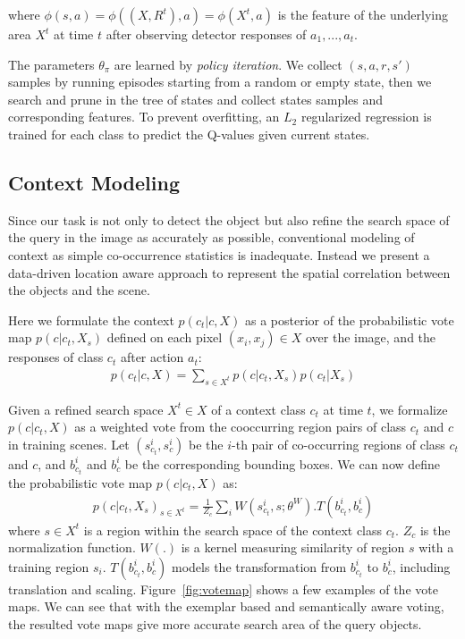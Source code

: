 where $\phi(s,a) = \phi((X, R^t),a) = \phi(X^t,a)$ is the feature of the underlying area $X^t$ at time $t$ after observing detector responses of $a_1,...,a_t$. 

The parameters $\theta_\pi$ are learned by \textit{policy iteration}. We collect $(s,a,r,s')$ samples by running episodes starting from a random or empty state, then we search and prune in the tree of states and collect states samples  and corresponding features. To prevent overfitting, an $L_2$ regularized regression is trained for each class to predict the Q-values given current states.

\subsection{Context Modeling}
\label{sec:context}
Since our task is not only to detect the object but also refine the search space of the query in the image as accurately as possible, conventional modeling of context as simple co-occurrence statistics is inadequate. Instead we present a data-driven location aware approach to represent the spatial correlation between the objects and the scene. 

Here we formulate the context $p(c_t|c,X)$ as a posterior of the probabilistic vote map $p(c|c_t,X_s)$ defined on each pixel $(x_i,x_j)\in X$ over the image, and the responses of class $c_t$ after action $a_t$:
\begin{eqnarray}
p(c_t|c,X) = \sum_{s\in X^t} p(c|c_t,X_s)p(c_t|X_s)
\end{eqnarray}

Given a refined search space $X^t\in X$ of a context class $c_t$ at time $t$, we formalize $p(c|c_t,X)$ as a weighted vote from the cooccurring region pairs of class $c_t$ and $c$ in training scenes. Let $(s_{c_t}^i, s_c^i)$ be the $i$-th pair of co-occurring regions of class $c_t$ and $c$, and $b_{c_t}^i$ and $b_c^i$ be the corresponding bounding boxes. We can now define the probabilistic vote map $p(c|c_t,X)$ as:
\begin{eqnarray}
\label{eq:votemap}
p(c|c_t,X_s)_{s\in X^t} = \frac{1}{Z_c}\sum_i W(s_{c_t}^i,s;\theta^W).T(b_{c_t}^i,b_c^i)
\end{eqnarray}
where $s\in X^t$ is a region within the search space of the context class $c_t$. $Z_c$ is the normalization function. $W(.)$ is a kernel measuring similarity of region $s$ with a training region $s_i$. $T(b_{c_t}^i,b_c^i)$ models the transformation from $b_{c_t}^i$ to $b_c^i$, including translation and scaling. Figure~\ref{fig:votemap} shows a few examples of the vote maps. We can see that with the exemplar based and semantically aware voting, the resulted vote maps give more accurate search area of the query objects.


